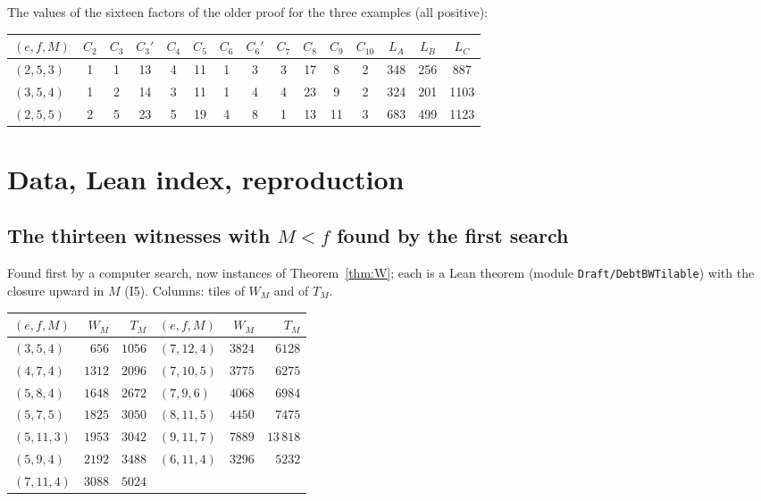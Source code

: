\documentclass[11pt,reqno]{amsart}
\theoremstyle{plain}
\theoremstyle{definition}
\begin{document}
The values of the sixteen factors of the older proof for the three examples (all positive):
\begin{center}\small
\begin{tabular}{@{}lcccccccccccccc@{}}
\toprule
$(e,f,M)$ & $C_2$ & $C_3$ & $C_3'$ & $C_4$ & $C_5$ & $C_6$ & $C_6'$ & $C_7$ & $C_8$ & $C_9$ & $C_{10}$ & $L_A$ & $L_B$ & $L_C$\\
\midrule
$(2,5,3)$ & 1 & 1 & 13 & 4 & 11 & 1 & 3 & 3 & 17 & 8 & 2 & 348 & 256 & 887\\
$(3,5,4)$ & 1 & 2 & 14 & 3 & 11 & 1 & 4 & 4 & 23 & 9 & 2 & 324 & 201 & 1103\\
$(2,5,5)$ & 2 & 5 & 23 & 5 & 19 & 4 & 8 & 1 & 13 & 11 & 3 & 683 & 499 & 1123\\
\bottomrule
\end{tabular}
\end{center}

\section{Data, Lean index, reproduction}\label{app:data}
\subsection{The thirteen witnesses with $M<f$ found by the first search}
Found first by a computer search, now instances of Theorem~\ref{thm:W}; each is a Lean theorem (module \texttt{Draft/DebtBWTilable}) with the closure upward in $M$ (I5). Columns: tiles of $W_M$ and of $T_M$.
\begin{center}\small
\begin{tabular}{@{}lrr@{\qquad}lrr@{}}
\toprule
$(e,f,M)$ & $W_M$ & $T_M$ & $(e,f,M)$ & $W_M$ & $T_M$\\
\midrule
$(3,5,4)$ & $656$ & $1056$ & $(7,12,4)$ & $3824$ & $6128$\\
$(4,7,4)$ & $1312$ & $2096$ & $(7,10,5)$ & $3775$ & $6275$\\
$(5,8,4)$ & $1648$ & $2672$ & $(7,9,6)$ & $4068$ & $6984$\\
$(5,7,5)$ & $1825$ & $3050$ & $(8,11,5)$ & $4450$ & $7475$\\
$(5,11,3)$ & $1953$ & $3042$ & $(9,11,7)$ & $7889$ & $13\,818$\\
$(5,9,4)$ & $2192$ & $3488$ & $(6,11,4)$ & $3296$ & $5232$\\
$(7,11,4)$ & $3088$ & $5024$ & & &\\
\bottomrule
\end{tabular}
\end{center}
\end{document}
